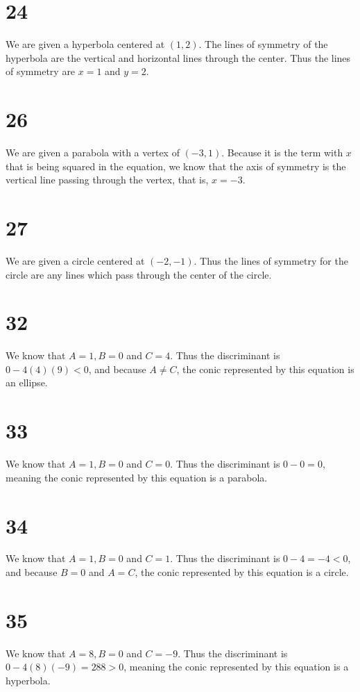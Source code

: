 \documentclass{article}
\theoremstyle{definition}
\newcommand{\?}{\stackrel{?}{=}}
\begin{document}
\section*{24}
We are given a hyperbola centered at $(1,2)$. The lines of symmetry of the hyperbola are the vertical and horizontal lines through the center. Thus the lines of 
symmetry are $x=1$ and $y=2$.

\section*{26}
We are given a parabola with a vertex of $(-3,1)$. Because it is the term with $x$ that is being squared in the equation, we know that the axis of symmetry is the 
vertical line passing through the vertex, that is, $x=-3$. 

\section*{27}
We are given a circle centered at $(-2,-1)$. Thus the lines of symmetry for the circle are any lines which pass through the center of the circle.

\section*{32}
We know that $A=1,B=0$ and $C=4$. Thus the discriminant is $0-4(4)(9)<0$, and because $A\ne C$, the conic represented by this equation is an ellipse.

\section*{33}
We know that $A=1,B=0$ and $C=0$. Thus the discriminant is $0-0=0$, meaning the conic represented by this equation is a parabola.

\section*{34}
We know that $A=1,B=0$ and $C=1$. Thus the discriminant is $0-4=-4<0$, and because $B=0$ and $A=C$, the conic represented by this equation is a circle.

\section*{35}
We know that $A=8,B=0$ and $C=-9$. Thus the discriminant is $0-4(8)(-9)=288>0$, meaning the conic represented by this equation is a hyperbola.
\end{document}
